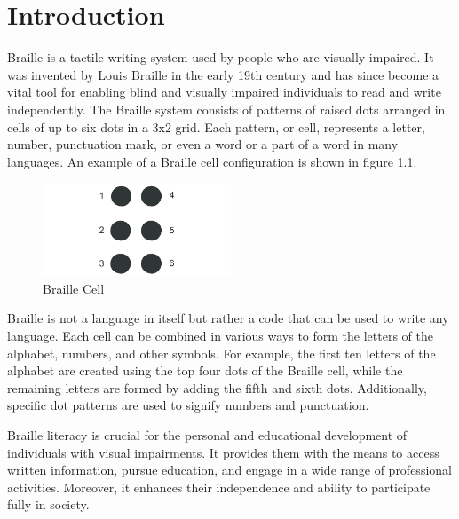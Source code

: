 \newpage
\section{{Introduction}
}




Braille is a tactile writing system used by people who are visually impaired. It was invented by Louis Braille in the early 19th century and has since become a vital tool for enabling blind and visually impaired individuals to read and write independently. The Braille system consists of patterns of raised dots arranged in cells of up to six dots in a 3x2 grid. Each pattern, or cell, represents a letter, number, punctuation mark, or even a word or a part of a word in many languages. An example of a Braille cell configuration is shown in figure 1.1.

\setcounter{figure}{0}
\renewcommand{\thefigure}{1.\arabic{figure}}

\begin{figure}[h]
\centering
\includegraphics[width=0.5\textwidth]{Braille-six-dot-cell.png}
\caption{Braille Cell}
\label{fig:example}
\end{figure}


Braille is not a language in itself but rather a code that can be used to write any language. Each cell can be combined in various ways to form the letters of the alphabet, numbers, and other symbols. For example, the first ten letters of the alphabet are created using the top four dots of the Braille cell, while the remaining letters are formed by adding the fifth and sixth dots. Additionally, specific dot patterns are used to signify numbers and punctuation.

Braille literacy is crucial for the personal and educational development of individuals with visual impairments. It provides them with the means to access written information, pursue education, and engage in a wide range of professional activities. Moreover, it enhances their independence and ability to participate fully in society.

